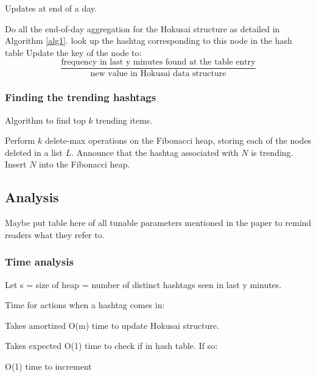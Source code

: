 \documentclass[a4paper,12pt]{article}
\begin{document}
\begin{algorithm}
\caption{Updates at end of a day.}
\begin{algorithmic}[1]
\State Do all the end-of-day aggregation for the Hokusai structure as detailed in Algorithm \ref{alg1}.
	\State look up the hashtag corresponding to this node in the hash table
	\State Update the key of the node to: \[\frac{\text{frequency in last y minutes found at the table entry}}{\text{new value in Hokusai data structure}}\]
\EndFor
\end{algorithmic}
\end{algorithm}

\subsubsection{Finding the trending hashtags}

\begin{algorithm}
\caption{Algorithm to find top $k$ trending items.}
\begin{algorithmic}[1]
\State Perform $k$ delete-max operations on the Fibonacci heap, storing each of the nodes deleted in a list $L$.
	\State Announce that the hashtag associated with $N$ is trending.
	\State Insert $N$ into the Fibonacci heap.
\EndFor
\end{algorithmic}
\end{algorithm}



\subsection{Analysis}

Maybe put table here of all tunable parameters mentioned in the paper to remind readers what they refer to.

\subsubsection{Time analysis}

Let s = size of heap = number of distinct hashtags seen in last y minutes.

Time for actions when a hashtag comes in:

	Takes amortized O(m) time to update Hokusai structure.

	Takes expected O(1) time to check if in hash table.  If so:

		O(1) time to increment
\end{document}
